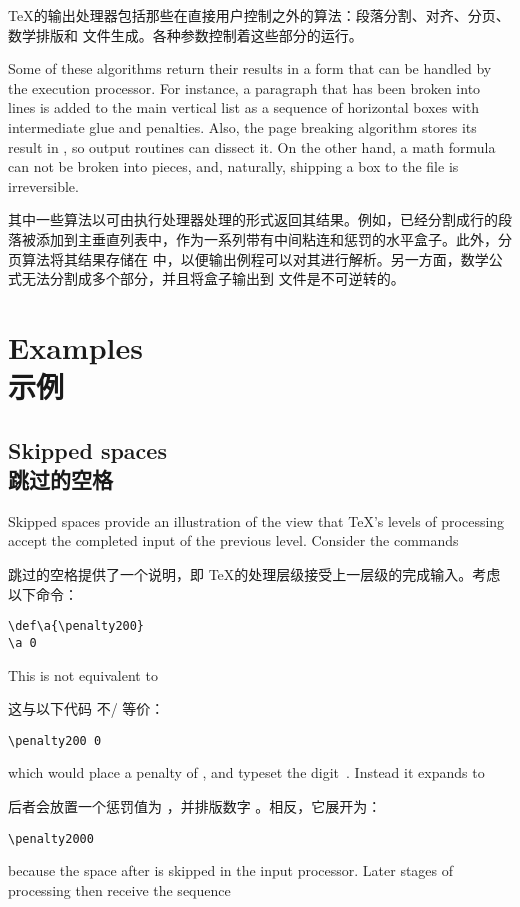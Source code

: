 \TeX 的输出处理器包括那些在直接用户控制之外的算法：段落分割、对齐、分页、数学排版和  文件生成。各种参数控制着这些部分的运行。

Some of these algorithms return their results in a form that
can be handled by the execution processor. For instance,
a paragraph that has been broken into lines is added to
the main vertical list as a sequence of horizontal boxes
with intermediate glue and penalties. Also, the page breaking
algorithm stores its result in , so output
routines can dissect it. On the other hand, a math formula
can not be broken into pieces, and, naturally, 
shipping a box to the  file is irreversible.

其中一些算法以可由执行处理器处理的形式返回其结果。例如，已经分割成行的段落被添加到主垂直列表中，作为一系列带有中间粘连和惩罚的水平盒子。此外，分页算法将其结果存储在  中，以便输出例程可以对其进行解析。另一方面，数学公式无法分割成多个部分，并且将盒子输出到  文件是不可逆转的。

\section{Examples\\示例}

\subsection{Skipped spaces\\跳过的空格}

Skipped spaces provide an illustration of the view that
\TeX's levels of processing accept the completed input
of the previous level. Consider the commands

跳过的空格提供了一个说明，即 \TeX 的处理层级接受上一层级的完成输入。考虑以下命令：
\begin{verbatim}
\def\a{\penalty200}
\a 0
\end{verbatim} 
This is {\italic not\/} equivalent to

这与以下代码 {\italic 不/} 等价：
\begin{verbatim}
\penalty200 0
\end{verbatim} 
\awp
which would place a penalty of , and
typeset the digit~. Instead it expands to

后者会放置一个惩罚值为 ，并排版数字 。相反，它展开为：
\begin{verbatim}
\penalty2000
\end{verbatim}
because the space after  is skipped in the
input processor. Later stages of processing then receive
the sequence 

